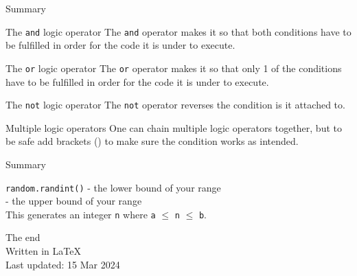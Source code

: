 \documentclass[dvipsnames, svgnames, x11names, handout]{beamer}
\begin{document}
\begin{frame}[fragile]{Summary}
\begin{block}{The \texttt{and} logic operator}
The \texttt{and} operator makes it so that both conditions have to be fulfilled in order for the code it is under to execute.
\end{block}
\begin{block}{The \texttt{or} logic operator}
The \texttt{or} operator makes it so that only 1 of the conditions have to be fulfilled in order for the code it is under to execute.
\end{block}
\begin{block}{The \texttt{not} logic operator}
The \texttt{not} operator reverses the condition is it attached to.
\end{block}
\begin{alertblock}{Multiple logic operators}
One can chain multiple logic operators together, but to be safe add brackets () to make sure the condition works as intended.
\end{alertblock}
\end{frame}

\begin{frame}[fragile]{Summary}
\begin{block}{\texttt{random.randint()}}
 - the lower bound of your range\\[1pt]
 - the upper bound of your range\\
This generates an integer \texttt{n} where \texttt{a} $\leq$ \texttt{n} $\leq$ \texttt{b}.
\end{block}
\end{frame}

\begin{frame}{\text{}}
	\begin{center}
		The end\\
		Written in \LaTeX\\
		Last updated: 15 Mar 2024
	\end{center}
\end{frame}
\end{document}
